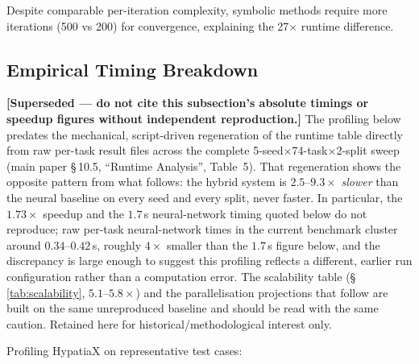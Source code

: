 \documentclass[twoside,11pt]{article}
\begin{document}
Despite comparable per-iteration complexity, symbolic methods require more iterations (500 vs 200) for convergence, explaining the 27$\times$ runtime difference.

\subsection{Empirical Timing Breakdown}

\textbf{[Superseded --- do not cite this subsection's absolute timings or
speedup figures without independent reproduction.]} The profiling below
predates the mechanical, script-driven regeneration of the runtime table
directly from raw per-task result files across the complete
5-seed$\times$74-task$\times$2-split sweep (main paper
\S\,10.5, ``Runtime Analysis'', Table~5). That regeneration
shows the opposite pattern from what follows: the hybrid system is
$2.5$--$9.3\times$ \emph{slower} than the neural baseline on every seed
and every split, never faster. In particular, the $1.73\times$ speedup
and the $1.7$\,s neural-network timing quoted below do not reproduce;
raw per-task neural-network times in the current benchmark cluster around
$0.34$--$0.42$\,s, roughly $4\times$ smaller than the $1.7$\,s figure
below, and the discrepancy is large enough to suggest this profiling
reflects a different, earlier run configuration rather than a computation
error. The scalability table (\S\,\ref{tab:scalability}, $5.1$--$5.8\times$)
and the parallelisation projections that follow are built on the same
unreproduced baseline and should be read with the same caution. Retained
here for historical/methodological interest only.

Profiling HypatiaX on representative test cases:
\end{document}
